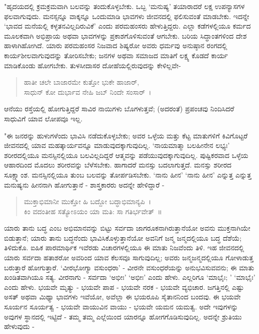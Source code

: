 "ಹೃದಯದಲ್ಲಿ ಕ್ರಮಕ್ರಮವಾಗಿ ಬಲವನ್ನು ತಂದುಕೊಳ್ಳಬೇಕು. ಒಬ್ಬ ‘ಮನುಷ್ಯ’ ತಯಾರಾದರೆ ಲಕ್ಷ ಉಪನ್ಯಾಸಗಳ ಫಲವಾಗುವುದು. ಮನಸ್ಸನ್ನೂ ವಾಕ್ಕನ್ನೂ ಒಂದುಮಾಡಿ ಭಾವಗಳು ಜೀವನದಲ್ಲಿ ಫಲಿಸುವಂತೆ ಮಾಡಬೇಕು. ಇದನ್ನೇ ‘ಭಾವದ ಮನೆಯಲ್ಲಿ ಕಳ್ಳತನವಿಲ್ಲದಿರುವಿಕೆ’ ಎಂದು ಪರಮಹಂಸರು ಹೇಳುತ್ತಿದ್ದರು. ಎಲ್ಲಾ ಕಡೆಗಳಲ್ಲಿಯೂ ಕರ್ಮದ ಮೂಲಕವಾಗಿ ಅಭಿಪ್ರಾಯ ಅಥವಾ ಭಾವಗಳನ್ನು ಪ್ರಕಾಶಗೊಳಿಸುವಂತೆ ಆಗಬೇಕು. ಬರಿಯ ಸಿದ್ಧಾಂತಗಳಿಂದ ದೇಶ ಹಾಳಾಗಿಹೋಗಿದೆ. ಯಾರು ಪರಮಹಂಸರ ನಿಜವಾದ ಶಿಷ್ಯರೋ ಅವರು ಧರ್ಮವು ಅನುಷ್ಠಾನ ರಂಗದಲ್ಲಿ ಕಾರ್ಯಶೀಲವಾಗುವುದನ್ನು ತೋರಿಸಬೇಕು; ಜನಗಳ ಅಥವಾ ಸಮಾಜದ ಮಾತಿಗೆ ಲಕ್ಷ್ಯ ಕೊಡದೆ ಕಾರ್ಯ ಮಾಡಿಕೊಂಡು ಹೋಗಬೇಕು. ತುಳಸೀದಾಸರ ದೋಹೆಯಲ್ಲಿರುವುದನ್ನು ಕೇಳಿಲ್ಲವೇ-

\begin{verse}
ಹಾತೀ ಚಲೇ ಬಾಜಾರಮೇ ಕುತ್ತೋ ಭುಕೇ ಹಾಜಾರ್,\\ಸಾಧುನ್ ಕೋ ದುರ್ಭಾವ ನೇಹಿ ಜಬ್ ನಿಂದೇ ಸಂಸಾರ್~।
\end{verse}

ಆನೆಯು ರಸ್ತೆಯಲ್ಲಿ ಹೋಗುತ್ತಿದ್ದರೆ ಸಾವಿರ ನಾಯಿಗಳು ಬೊಗಳುತ್ತವೆ; (ಅದರಂತೆ) ಪ್ರಪಂಚವು ನಿಂದಿಸಿದರೆ ಸಾಧುವಿಗೆ ಯಾವ ಲೋಪವೂ ಇಲ್ಲ.

"ಈ ಜನರನ್ನು ಹುಳುಗಳೆಂದು ಭಾವಿಸಿ ನಡೆದುಕೊಳ್ಳಬೇಕು; ಅವರ ಒಳ್ಳೆಯ ಮತ್ತು ಕೆಟ್ಟ ಮಾತುಗಳಿಗೆ ಕಿವಿಗೊಟ್ಟರೆ ಜೀವನದಲ್ಲಿ ಯಾವ ಮಹತ್ಕಾರ್ಯವನ್ನೂ ಮಾಡುವುದಕ್ಕಾಗುವುದಿಲ್ಲ. ‘ನಾಯಮಾತ್ಮಾ ಬಲಹೀನೇನ ಲಭ್ಯಃ’ ಶರೀರದಲ್ಲಿಯೂ ಮನಸ್ಸಿನಲ್ಲಿಯೂ ಬಲವಿಲ್ಲದಿದ್ದರೆ ಆತ್ಮವನ್ನು ಪಡೆಯುವುದಕ್ಕಾಗುವುದಿಲ್ಲ. ಪುಷ್ಟಿಕರವಾದ ಒಳ್ಳೆಯ ಆಹಾರದಿಂದ ಮೊದಲು ಶರೀರವನ್ನು ಬೆಳೆಸಬೇಕು. ಹಾಗಾದರೆ ಮನಸ್ಸು ಬದಲಾಗುತ್ತದೆ. ಮನಸ್ಸು ಶರೀರದ ಸೂಕ್ಷ್ಮಾಂಶ. ಮನಸ್ಸಿನಲ್ಲಿಯೂ ತುಂಬ ಬಲವನ್ನು ತೋರ್ಪಡಿಸಬೇಕು. ‘ನಾನು ಹೀನ’ ‘ನಾನು ಹೀನ’ ಎನ್ನುತ್ತ ಎನ್ನುತ್ತ ಮನುಷ್ಯನು ಹೀನನಾಗಿ ಹೋಗುತ್ತಾನೆ - ಶಾಸ್ತ್ರಕಾರರು ಅದನ್ನೇ ಹೇಳಿದ್ದಾರೆ -

\begin{verse}
ಮುಕ್ತಾಭಿಮಾನೀ ಮುಕ್ತೋ ಹಿ ಬದ್ದೋ ಬದ್ಧಾಭಿಮಾನ್ಯಪಿ~।\\ಕಿಂ ವದಂತೀಹ ಸತ್ಯೋಽಯಂ ಯಾ ಮತಿ: ಸಾ ಗತಿರ್ಭವೇತ್~॥
\end{verse}

ಯಾರು ತಾನು ಬದ್ಧ ಎಂಬ ಅಭಿಮಾನವನ್ನು ಬಿಟ್ಟು ಸರ್ವದಾ ಜಾಗರೂಕನಾಗಿರುತ್ತಾನೆಯೋ ಅವನು ಮುಕ್ತನಾಗಿಯೇ ಬಿಡುತ್ತಾನೆ; ಯಾರು ತಾನು ಬದ್ಧನೆಂದು ಭಾವಿಸಿಕೊಳ್ಳುತ್ತಾನೆಯೋ ಅವನಿಗೆ ಜನ್ಮ ಜನ್ಮದಲ್ಲಿಯೂ ಬದ್ಧ ದೆಶೆಯೆ; ತಿಳಿದುಕೊ. ಐಹಿಕ ಪಾರಮಾರ್ಥಿಕ ಇವೆರಡು ವಿಚಾರಗಳಲ್ಲಿಯೂ ಈ ಮಾತು ನಿಜವೆಂದು ತಿಳಿ. ಇಹ ಜೀವನದಲ್ಲಿ ಯಾರು ಸರ್ವದಾ ಹತಾಶರೋ ಅವರಿಂದ ಯಾವ ಕೆಲಸವೂ ಸಾಗುವುದಿಲ್ಲ; ಅವರು ಜನ್ಮಜನ್ಮದಲ್ಲಿಯೂ ಗೋಳಾಡುತ್ತ ಬರುತ್ತಾರೆ ಹೋಗುತ್ತಾರೆ. ‘ವೀರಭೋಗ್ಯಾ ವಸುಂಧರಾ’ - ವೀರನೇ ವಸುಂಧರೆಯನ್ನು ಅನುಭವಿಸುವವನು; ಈ ಮಾತು ಖಂಡಿತವಾಗಿಯೂ ಸತ್ಯ. ವೀರನಾಗು - ಸರ್ವದಾ ‘ಅಭೀಃ’ ‘ಅಭೀಃ’ ಎಂದು ಹೇಳು. ಎಲ್ಲರಿಗೂ ‘ಮಾಭೈಃ; ’ ‘ಮಾಭೈಃ’ ಎಂದು ಹೇಳು. ಭಯವೇ ಮೃತ್ಯು - ಭಯವೇ ಪಾಪ - ಭಯವೇ ನರಕ - ಭಯವೇ ವ್ಯಭಿಚಾರ. ಜಗತ್ತಿನಲ್ಲಿ ಎಷ್ಟು ಅಸತ್ ಅಥವಾ ಮಿಥ್ಯಾ ಭಾವಗಳು ಇವೆಯೋ, ಅವೆಲ್ಲಾ ಈ ಭಯರೂಪಿ ಸೈತಾನನಿಂದ ಬಂದವು. ಈ ಭಯವೇ ಸೂರ್ಯನ ಸೂರ್ಯತ್ವ - ಭಯವೇ ವಾಯುವಿನ ವಾಯು - ಭಯವೇ ಯಮನ ಯಮತ್ವ. ಅದೇ ಇವುಗಳನ್ನು ಅವುಗಳ ಸ್ಥಾನದಲ್ಲಿ ಇಟ್ಟಿದೆ - ತಮ್ಮ ತಮ್ಮ ಎಲ್ಲೆಯಿಂದ ಯಾರನ್ನೂ ಹೋಗಗೊಡಿಸುವುದಿಲ್ಲ. ಅದನ್ನೇ ಶ್ರುತಿಯು ಹೇಳುವುದು -

